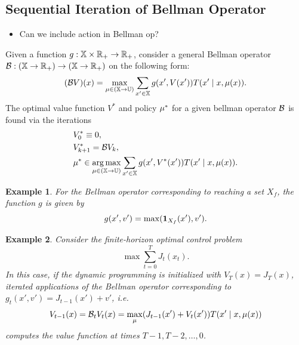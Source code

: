 \documentclass[conference]{IEEEtran}
\newtheorem{example}{Example}
\newcommand{\red}[1]{{\color{red} #1 }}
\begin{document}
\subsection{Sequential Iteration of Bellman Operator}

\begin{itemize}
  \item \red{Can we include action in Bellman op?}
\end{itemize}

Given a function $g: \mathbb{X} \times \mathbb{R}_+ \rightarrow \mathbb{R}_+$, consider a general Bellman operator $\mathcal{B} : (\mathbb{X} \rightarrow \mathbb{R}_+) \rightarrow (\mathbb{X} \rightarrow \mathbb{R}_+)$ on the following form:
\begin{equation}
  (\mathcal{B} V) (x) = \max_{\mu \in (\mathbb{X} \rightarrow \mathbb{U})} \sum_{x' \in \mathbb{X}}  g(x', V(x')) T(x' \mid x, \mu(x)).
\end{equation}
The optimal value function $V^*$ and policy $\mu^*$ for a given bellman operator $\mathcal{B}$ is found via the iterations
\begin{subequations}
\label{eq:value_iter}
  \begin{align}
    & V^*_0 \equiv 0, \\
    & V^*_{k+1}  = \bellman V_k \label{eq:iter}, \\
    & \pol^* \in \argmax_{\pol \in (\X \rightarrow \U)} \sum_{x' \in \X}  g(x', V^*(x')) T(x' \mid x, \pol(x)).
  \end{align}
\end{subequations}

\begin{example}
  For the Bellman operator corresponding to reaching a set $X_f$, the function $g$ is given by
  \begin{equation*}
    g(x', v') = \max( \mathbf{1}_{X_f}(x'), v').
  \end{equation*}
\end{example}

\begin{example}
  Consider the finite-horizon optimal control problem 
  \begin{equation}
     \max \sum_{t=0}^T J_t(x_t).
  \end{equation} 
  In this case, if the dynamic programming is initialized with $V_T(x) = J_T(x)$, iterated applications of the Bellman operator corresponding to $g_t(x', v') = J_{t-1}(x') + v'$, i.e.
  \begin{equation*}
    V_{t-1}(x) = \mathcal{B}_t V_{t} (x) = \max_{\mu} (J_{t-1}(x') + V_{t}(x')) T(x' \mid x, \mu(x))
  \end{equation*}
  computes the value function at times $T-1, T-2, \ldots, 0$.
\end{example}
\end{document}

